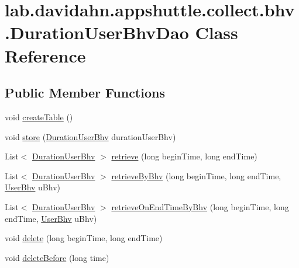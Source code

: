 \hypertarget{classlab_1_1davidahn_1_1appshuttle_1_1collect_1_1bhv_1_1_duration_user_bhv_dao}{\section{lab.\-davidahn.\-appshuttle.\-collect.\-bhv.\-Duration\-User\-Bhv\-Dao \-Class \-Reference}
\label{classlab_1_1davidahn_1_1appshuttle_1_1collect_1_1bhv_1_1_duration_user_bhv_dao}
}
\subsection*{\-Public \-Member \-Functions}
\begin{DoxyCompactItemize}
\item 
void \hyperlink{classlab_1_1davidahn_1_1appshuttle_1_1collect_1_1bhv_1_1_duration_user_bhv_dao_a95734fc3116e74745661eb7d82b41d9b}{create\-Table} ()
\item 
void \hyperlink{classlab_1_1davidahn_1_1appshuttle_1_1collect_1_1bhv_1_1_duration_user_bhv_dao_a11f11c8252823e26cc3d2d5667f320cd}{store} (\hyperlink{classlab_1_1davidahn_1_1appshuttle_1_1collect_1_1bhv_1_1_duration_user_bhv}{\-Duration\-User\-Bhv} duration\-User\-Bhv)
\item 
\-List$<$ \hyperlink{classlab_1_1davidahn_1_1appshuttle_1_1collect_1_1bhv_1_1_duration_user_bhv}{\-Duration\-User\-Bhv} $>$ \hyperlink{classlab_1_1davidahn_1_1appshuttle_1_1collect_1_1bhv_1_1_duration_user_bhv_dao_a361c8bc6da5d1aea6214b7d8524e160d}{retrieve} (long begin\-Time, long end\-Time)
\item 
\-List$<$ \hyperlink{classlab_1_1davidahn_1_1appshuttle_1_1collect_1_1bhv_1_1_duration_user_bhv}{\-Duration\-User\-Bhv} $>$ \hyperlink{classlab_1_1davidahn_1_1appshuttle_1_1collect_1_1bhv_1_1_duration_user_bhv_dao_a57f7c7cc2c499dff99f46d365eecf6e6}{retrieve\-By\-Bhv} (long begin\-Time, long end\-Time, \hyperlink{interfacelab_1_1davidahn_1_1appshuttle_1_1collect_1_1bhv_1_1_user_bhv}{\-User\-Bhv} u\-Bhv)
\item 
\-List$<$ \hyperlink{classlab_1_1davidahn_1_1appshuttle_1_1collect_1_1bhv_1_1_duration_user_bhv}{\-Duration\-User\-Bhv} $>$ \hyperlink{classlab_1_1davidahn_1_1appshuttle_1_1collect_1_1bhv_1_1_duration_user_bhv_dao_af2803e2cacbc7311826226e0c5c88d81}{retrieve\-On\-End\-Time\-By\-Bhv} (long begin\-Time, long end\-Time, \hyperlink{interfacelab_1_1davidahn_1_1appshuttle_1_1collect_1_1bhv_1_1_user_bhv}{\-User\-Bhv} u\-Bhv)
\item 
void \hyperlink{classlab_1_1davidahn_1_1appshuttle_1_1collect_1_1bhv_1_1_duration_user_bhv_dao_a0e6b8122263065e179499db4283d3664}{delete} (long begin\-Time, long end\-Time)
\item 
void \hyperlink{classlab_1_1davidahn_1_1appshuttle_1_1collect_1_1bhv_1_1_duration_user_bhv_dao_aa2cd4efa0f9c024d4d27f00a0bcad0ea}{delete\-Before} (long time)
\end{DoxyCompactItemize}
